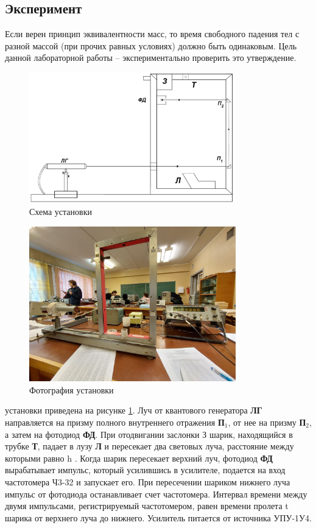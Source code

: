 \subsection{Эксперимент}
Если верен принцип эквивалентности масс, то время свободного падения тел с разной массой (при прочих равных условиях) должно быть одинаковым. Цель данной лабораторной работы – экспериментально проверить это утверждение.
\begin{figure}[H]
\centering
\includegraphics[width=0.8\textwidth]{Схема установки.png}
\caption{Схема установки}
\label{fig:1}
\end{figure}
\begin{figure}[H]
\centering
\includegraphics[width=0.8\textwidth]{Фотография установки.jpg}
\caption{Фотография установки}
\label{fig:2}
\end{figure}
 установки приведена на рисунке \ref{fig:1}. Луч от квантового генератора \textbf{ЛГ} направляется на призму полного внутреннего отражения \textbf{П$_1$}, от нее на призму \textbf{П$_2$}, а затем на фотодиод \textbf{ФД}. При отодвигании заслонки З шарик, находящийся в трубке \textbf{Т}, падает в лузу \textbf{Л} и пересекает два световых луча, расстояние между которыми равно h . Когда шарик пересекает верхний луч, фотодиод \textbf{ФД} вырабатывает импульс, который усилившись в усилителе, подается на вход частотомера Ч3-32 и запускает его. При пересечении шариком нижнего луча импульс от фотодиода останавливает счет частотомера. Интервал времени между двумя импульсами, регистрируемый частотомером, равен времени пролета t шарика от верхнего луча до нижнего. Усилитель питается от источника УПУ-1У4.
